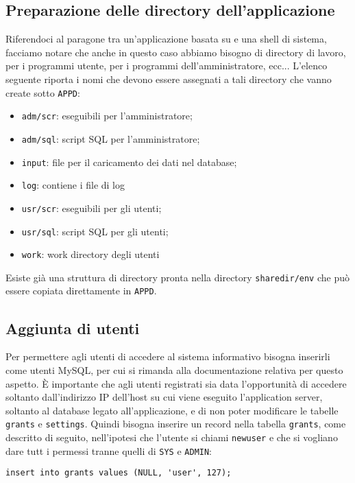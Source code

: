 \subsection{Preparazione delle directory dell'applicazione}
Riferendoci al paragone tra un'applicazione basata su \mcs e una
shell di sistema, facciamo notare che anche in questo caso abbiamo
bisogno di directory di lavoro, per i programmi utente, per i
programmi dell'amministratore, ecc... L'elenco seguente riporta i nomi
che devono essere assegnati a tali directory che vanno create sotto
\verb|APPD|:
\begin{itemize}
\item \verb|adm/scr|: eseguibili per l'amministratore;
\item \verb|adm/sql|: script SQL per l'amministratore;
\item \verb|input|: file per il caricamento dei dati nel database;
\item \verb|log|: contiene i file di log
\item \verb|usr/scr|: eseguibili per gli utenti;
\item \verb|usr/sql|: script SQL per gli utenti;
\item \verb|work|: work directory degli utenti
\end{itemize}
%
Esiste gi\`a una struttura di directory pronta nella directory
\verb|sharedir/env| che pu\`o essere copiata direttamente in
\verb|APPD|.

\subsection{Aggiunta di utenti}
Per permettere agli utenti di accedere al sistema informativo bisogna
inserirli come utenti MySQL, per cui si rimanda alla documentazione
relativa per questo aspetto. \`E importante che agli utenti registrati
sia data l'opportunit\`a di accedere soltanto dall'indirizzo IP
dell'host su cui viene eseguito l'application server, soltanto al
database legato all'applicazione, e di non poter modificare le tabelle
\verb|grants| e \verb|settings|. Quindi bisogna inserire un record
nella tabella \verb|grants|, come descritto di seguito, nell'ipotesi
che l'utente si chiami \verb|newuser| e che si vogliano dare tutt i
permessi tranne quelli di \verb|SYS| e \verb|ADMIN|:

\begin{verbatim}
insert into grants values (NULL, 'user', 127);
\end{verbatim}


